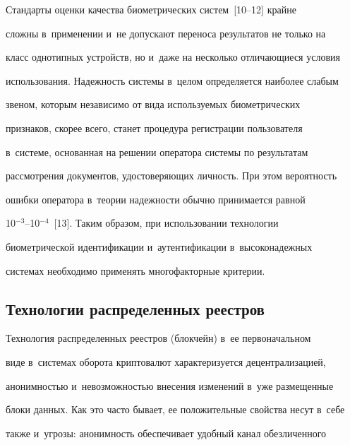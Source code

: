      


   Стандарты оценки качества биометрических систем~[10--12] крайне 


сложны в~применении и~не допускают переноса результатов не только на 


класс однотипных устройств, но и~даже на несколько отличающиеся условия 


использования. Надежность системы в~целом определяется наиболее слабым 


звеном, которым независимо от вида используемых биометрических 


признаков, скорее всего, станет процедура регистрации пользователя 


в~системе, основанная на решении оператора системы по результатам 


рассмотрения документов, удостоверяющих личность. При этом вероятность 


ошибки оператора в~теории надежности обычно принимается равной  


10$^{-3}$--10$^{-4}$~[13]. Таким образом, при использовании технологии 


биометрической идентификации и~аутентификации в~высоконадежных 


системах необходимо применять многофакторные критерии. 





\vspace*{-4pt}





\subsection{Технологии распределенных реестров}





\vspace*{-2pt}





  Технология распределенных реестров (блокчейн) в~ее первоначальном 


виде в~системах оборота криптовалют характеризуется децентрализацией, 


ано\-ним\-ностью и~невозможностью внесения изменений в~уже размещенные 


блоки данных. Как это часто бывает, ее положительные свойства несут в~себе 


также и~угрозы: анонимность обеспечивает удобный канал обезличенного 


